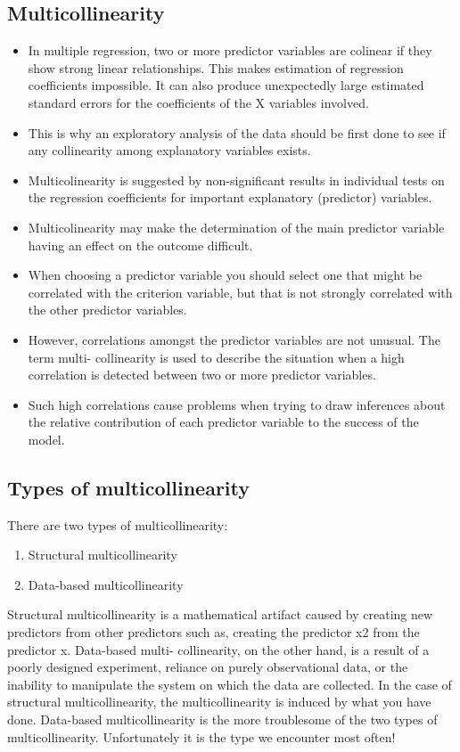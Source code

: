 \documentclass[]{report}
\begin{document}
\subsection{Multicollinearity}
\begin{itemize}
\item In multiple regression, two or more predictor variables are colinear if they show strong
linear relationships. This makes estimation of regression coefficients impossible. It can
also produce unexpectedly large estimated standard errors for the coefficients of the X
variables involved.
\item This is why an exploratory analysis of the data should be first done to see if any collinearity
among explanatory variables exists.
\item Multicolinearity is suggested by non-significant results in individual tests on the regression
coefficients for important explanatory (predictor) variables.
\item Multicolinearity may make the determination of the main predictor variable having an
effect on the outcome difficult.
\item When choosing a predictor variable you should select one that might be correlated with
the criterion variable, but that is not strongly correlated with the other predictor variables.
\item However, correlations amongst the predictor variables are not unusual. The term multi-
collinearity is used to describe the situation when a high correlation is detected between
two or more predictor variables.
\item Such high correlations cause problems when trying to draw inferences about the relative
contribution of each predictor variable to the success of the model.
\end{itemize}
\subsection{Types of multicollinearity}
There are two types of multicollinearity:
\begin{enumerate}
\item Structural multicollinearity
\item Data-based multicollinearity
\end{enumerate}
Structural multicollinearity is a mathematical artifact caused by creating new predictors from
other predictors such as, creating the predictor x2 from the predictor x. Data-based multi-
collinearity, on the other hand, is a result of a poorly designed experiment, reliance on purely
observational data, or the inability to manipulate the system on which the data are collected.
In the case of structural multicollinearity, the multicollinearity is induced by what you have
done. Data-based multicollinearity is the more troublesome of the two types of multicollinearity.
Unfortunately it is the type we encounter most often!
\end{document}

